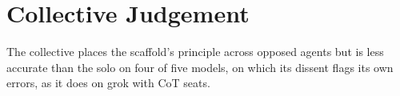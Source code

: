 \section{Collective Judgement}
\label{sec-collective}

The collective places the scaffold's principle across opposed agents but is
less accurate than the solo on four of five models, on which its dissent
flags its own errors, as it does on grok with CoT seats.

